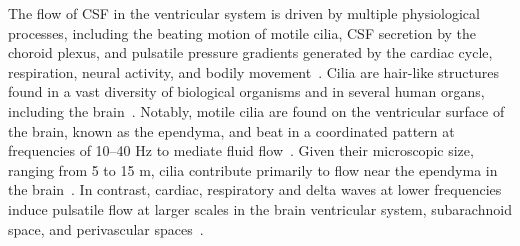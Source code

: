 \documentclass{WileyMSP-template}
\begin{document}
The flow of CSF in the ventricular system is driven by multiple
physiological processes, including the beating motion of motile
cilia, CSF secretion by the choroid plexus, and pulsatile pressure
gradients generated by the cardiac cycle, respiration, neural
activity, and bodily movement~\cite{Brodal2016, del2010ependymal,
Ringers2020Role, Vinje2019RespiratoryMeasurements,
Kurtcuoglu2005ComputationalSystem, Olstad2019CiliaryDevelopment,
macaulay2022cerebrospinal, mestre2018flow, Williams2023NeuralActivity}. 
Cilia are hair-like structures found in a vast diversity of
biological organisms and in
several human organs, including the brain~\cite{DGama2025MotileBrain,
Fulford1986Muco-ciliaryLung, Pacherres2022CiliaryProduction,
Jahn1972LocomotionProtozoa, Brennen1977FluidFlagella,
Ringers2020Role, spassky2013motile, Pellicciotta2020Cilia,
mitchell2007evolution, Tsukita2012CoordinatedFeet,
BLAKE1974MechanicsMotion,
Reiten2017Motile-Cilia-MediatedComputations,
Thouvenin2020OriginCanal}. Notably, motile cilia
are found on the ventricular surface of the brain,
known as the ependyma, and beat in a
coordinated pattern at frequencies of 10--40 Hz to mediate fluid
flow~\cite{mitchell2007evolution, Ringers2020Role, spassky2013motile,
Ringers2023NovelEpithelia, roth2025structure}. Given their
microscopic size, ranging from 5 to 15 \textmu m, cilia contribute
primarily to flow near the ependyma in the
brain~\cite{Siyahhan2014FlowVentricles, Olstad2019CiliaryDevelopment,
Ringers2020Role, Faubel2016Cilia-basedVentricles}. In contrast,
cardiac, respiratory and delta waves at lower frequencies induce
pulsatile flow at larger scales in the brain ventricular system,
subarachnoid space, and perivascular
spaces~\cite{Vinje2019RespiratoryMeasurements, eide2024functional,
Causemann2025, fultz2019coupled, mestre2018flow,
daversin2020mechanisms}.
\end{document}
